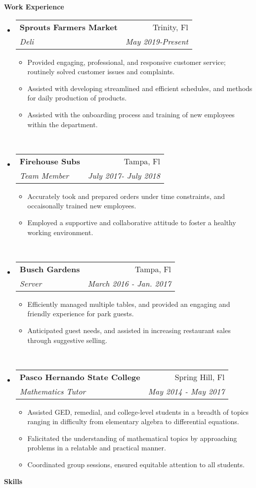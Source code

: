 \documentclass[letterpaper, 10pt]{article}
\makeatletter
\newcommand{\resitem}[1]{\item #1 \vspace{-2pt}}
\newcommand{\resheading}[1]{{\large \colorbox{mywhite}{\begin{minipage}{\dimexpr\textwidth-2\fboxsep}
    {\textbf{#1 \vphantom{p\^{E}}}}\end{minipage}}}}
\newcommand{\ressubheading}[4]{
    \begin{tabular*}{\linewidth}{l@{\extracolsep{\fill}}r}
        \textbf{#1} & #2 \\
        \textit{#3} & \textit{#4} \\
    \end{tabular*}\vspace{-6pt}
}
\makeatother
\begin{document}
\resheading{Work Experience}
\begin{itemize}
\item
    \ressubheading{Sprouts Farmers Market}{Trinity, Fl}{Deli}{May 2019-Present}
    \begin{itemize}
        \resitem{Provided engaging, professional, and responsive customer service; routinely
            solved customer issues and complaints.}
        \resitem{Assisted with developing streamlined and efficient schedules, and methods 
            for daily production of products.}
            \resitem{Assisted with the onboarding process and training of new employees within 
            the department.}
    \end{itemize}
\ \\
\item
    \ressubheading{Firehouse Subs}{Tampa, Fl}{Team Member}{July 2017- July 2018}
    \begin{itemize}
        \resitem{Accurately took and prepared orders under time constraints, and occaisonally
        trained new employees.}
        \resitem{Employed a supportive and collaborative attitude to foster a healthy working environment.}
    \end{itemize}
\ \\
\item 
    \ressubheading{Busch Gardens}{Tampa, Fl}{Server}{March 2016 - Jan. 2017}
    \begin{itemize}
        \resitem{Efficiently managed multiple tables, and provided an engaging and friendly 
            experience for park guests.} 
        \resitem{Anticipated guest needs, and assisted in increasing restaurant sales through
            suggestive selling.}
    \end{itemize}
\ \\
\item
    \ressubheading{Pasco Hernando State College}{Spring Hill, Fl}{Mathematics Tutor}{May 2014 - May 2017}
    \begin{itemize}
        \resitem{Assisted GED, remedial, and college-level students in a breadth of topics ranging in difficulty from elementary algebra to differential equations.}
        \resitem{Falicitated the understanding of mathematical topics by approaching problems in a relatable and practical manner.}
        \resitem{Coordinated group sessions, ensured equitable attention to all students.}
    \end{itemize}
\end{itemize}
\resheading{Skills}
    
\end{document}
